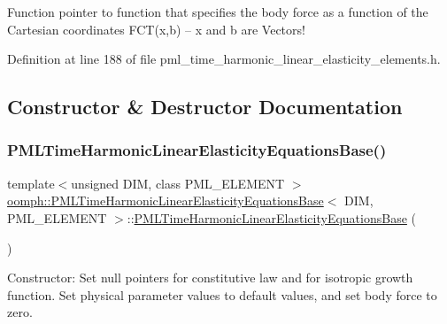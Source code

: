 Function pointer to function that specifies the body force as a function of the Cartesian coordinates F\+C\+T(x,b) -- x and b are Vectors! 



Definition at line 188 of file pml\+\_\+time\+\_\+harmonic\+\_\+linear\+\_\+elasticity\+\_\+elements.\+h.



\subsection{Constructor \& Destructor Documentation}
\mbox{\label{classoomph_1_1PMLTimeHarmonicLinearElasticityEquationsBase_afe626efd0784e879ed0b919fce975865}} 
\subsubsection{\texorpdfstring{P\+M\+L\+Time\+Harmonic\+Linear\+Elasticity\+Equations\+Base()}{PMLTimeHarmonicLinearElasticityEquationsBase()}}
{\footnotesize\ttfamily template$<$unsigned D\+IM, class P\+M\+L\+\_\+\+E\+L\+E\+M\+E\+NT $>$ \\
\hyperlink{classoomph_1_1PMLTimeHarmonicLinearElasticityEquationsBase}{oomph\+::\+P\+M\+L\+Time\+Harmonic\+Linear\+Elasticity\+Equations\+Base}$<$ D\+IM, P\+M\+L\+\_\+\+E\+L\+E\+M\+E\+NT $>$\+::\hyperlink{classoomph_1_1PMLTimeHarmonicLinearElasticityEquationsBase}{P\+M\+L\+Time\+Harmonic\+Linear\+Elasticity\+Equations\+Base} (\begin{DoxyParamCaption}{ }\end{DoxyParamCaption})\hspace{0.3cm}{\ttfamily [inline]}}



Constructor\+: Set null pointers for constitutive law and for isotropic growth function. Set physical parameter values to default values, and set body force to zero. 



